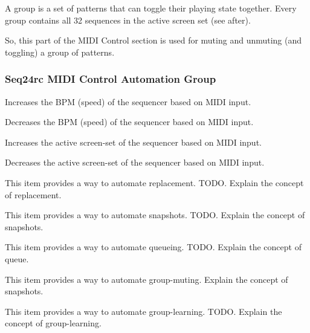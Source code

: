    A group is a set of patterns that can toggle their playing state
   together.  Every group contains all 32 sequences in the active screen set
   (see after).

   So, this part of the MIDI Control section is used for muting and unmuting
   (and toggling) a group of patterns.

\subsubsection{Seq24rc MIDI Control Automation Group}
\label{subsubsec:seq24_rc_file_midi_control_automation_group}


   \setcounter{ItemCounter}{0}      %

   Increases the BPM (speed) of the sequencer based on MIDI input.

   Decreases the BPM (speed) of the sequencer based on MIDI input.

   Increases the active screen-set of the sequencer based on MIDI input.

   Decreases the active screen-set of the sequencer based on MIDI input.

   This item provides a way to automate replacement.
   TODO.
   Explain the concept of replacement.

   This item provides a way to automate snapshots.
   TODO.
   Explain the concept of snapshots.

   This item provides a way to automate queueing.
   TODO.
   Explain the concept of queue.

   This item provides a way to automate group-muting.
   Explain the concept of snapshots.

   This item provides a way to automate group-learning.
   TODO.
   Explain the concept of group-learning.

